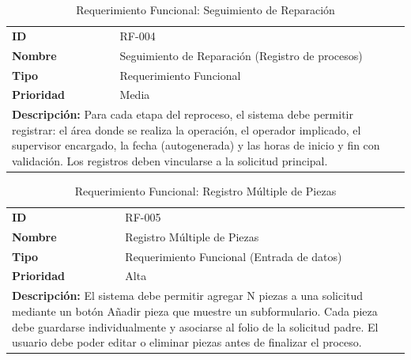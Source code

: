 \documentclass[12pt,letterpaper,spanish]{report}
\begin{document}
\begin{table}[H]
    \centering
    \caption{Requerimiento Funcional: Seguimiento de Reparación}
    \label{tab:rf004}
    \begin{tabular}{ll}
        \toprule
        \textbf{ID} & RF-004 \\
        \textbf{Nombre} & Seguimiento de Reparación (Registro de procesos) \\
        \textbf{Tipo} & Requerimiento Funcional \\
        \textbf{Prioridad} & Media \\
        \midrule
        \multicolumn{2}{l}{
            \parbox{0.9\linewidth}{
                \textbf{Descripción:} Para cada etapa del reproceso, el sistema debe permitir registrar: el área donde se realiza la operación, el operador implicado, el supervisor encargado, la fecha (autogenerada) y las horas de inicio y fin con validación. Los registros deben vincularse a la solicitud principal.
            }
        } \\
        \bottomrule
    \end{tabular}
\end{table}

\begin{table}[H]
    \centering
    \caption{Requerimiento Funcional: Registro Múltiple de Piezas}
    \label{tab:rf005}
    \begin{tabular}{ll}
        \toprule
        \textbf{ID} & RF-005 \\
        \textbf{Nombre} & Registro Múltiple de Piezas \\
        \textbf{Tipo} & Requerimiento Funcional (Entrada de datos) \\
        \textbf{Prioridad} & Alta \\
        \midrule
        \multicolumn{2}{l}{
            \parbox{0.9\linewidth}{
                \textbf{Descripción:} El sistema debe permitir agregar N piezas a una solicitud mediante un botón Añadir pieza que muestre un subformulario. Cada pieza debe guardarse individualmente y asociarse al folio de la solicitud padre. El usuario debe poder editar o eliminar piezas antes de finalizar el proceso.
            }
        } \\
        \bottomrule
    \end{tabular}
\end{table}
\end{document}
